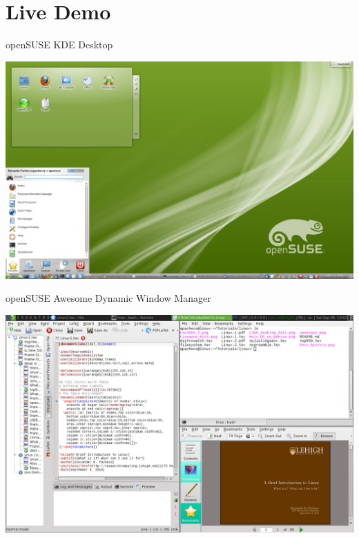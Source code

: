 \documentclass[10pt,t]{beamer}
\begin{document}
\section{Live Demo}
\begin{frame}{openSUSE KDE Desktop}
  \begin{center}
    \includegraphics[width=\textwidth]{./opensuse}
  \end{center}
\end{frame}
\begin{frame}{openSUSE Awesome Dynamic Window Manager}
  \begin{center}
    \includegraphics[width=\textwidth]{./opensuse-awesome}
  \end{center}
\end{frame}
\end{document}
